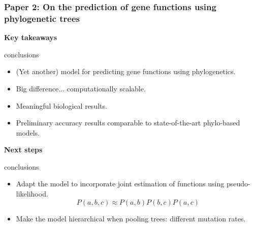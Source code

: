 \documentclass[aspectratio=169, 9pt, handout]{beamer}\usepackage[]{graphicx}\usepackage[]{color}
\begin{document}
\begin{frame}
\frametitle{Paper 2: On the prediction of gene functions using phylogenetic trees}

{\bf \large Key takeaways}
\begin{beamercolorbox}[dp=1ex]{conclusions}
\begin{itemize}
\item (Yet another) model for predicting gene functions using phylogenetics.
\item Big difference... computationally scalable.
\item Meaningful biological results.
\item Preliminary accuracy results comparable to state-of-the-art phylo-based models.
\end{itemize}
\end{beamercolorbox}

\vfill\pause

{\bf \large Next steps}
\begin{beamercolorbox}[dp=1ex]{conclusions}
\begin{itemize}
\item Adapt the model to incorporate joint estimation of functions using pseudo-likelihood.
$$
P(a, b, c) \approx P(a,b)P(b,c)P(a,c)
$$
\item Make the model hierarchical when pooling trees: different mutation rates.
\end{itemize}
\end{beamercolorbox}

\end{frame}

% 

\begin{frame}
\maketitle
\begin{center}
\scalebox{2}{\textcolor{uscgold}{Thanks!}}
\end{center}
\end{frame}
\end{document}
